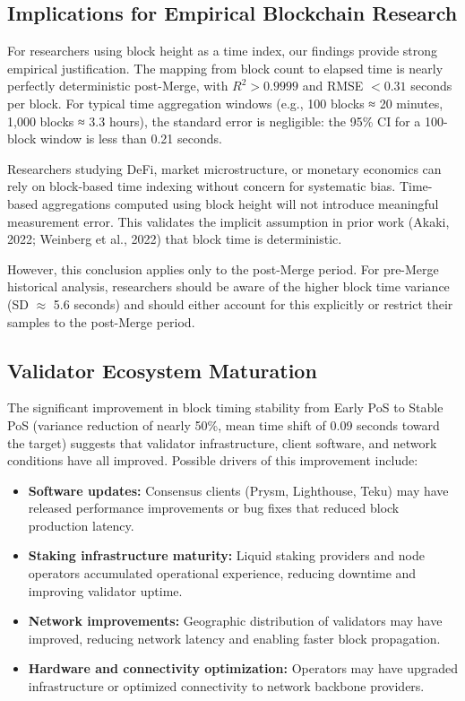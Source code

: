 \documentclass[12pt]{article}
\begin{document}
\subsection{Implications for Empirical Blockchain Research}

For researchers using block height as a time index, our findings provide strong empirical justification. The mapping from block count to elapsed time is nearly perfectly deterministic post-Merge, with $R^2 > 0.9999$ and RMSE $< 0.31$ seconds per block. For typical time aggregation windows (e.g., 100 blocks ≈ 20 minutes, 1,000 blocks ≈ 3.3 hours), the standard error is negligible: the 95\% CI for a 100-block window is less than 0.21 seconds.

Researchers studying DeFi, market microstructure, or monetary economics can rely on block-based time indexing without concern for systematic bias. Time-based aggregations computed using block height will not introduce meaningful measurement error. This validates the implicit assumption in prior work (Akaki, 2022; Weinberg et al., 2022) that block time is deterministic.

However, this conclusion applies only to the post-Merge period. For pre-Merge historical analysis, researchers should be aware of the higher block time variance (SD $\approx$ 5.6 seconds) and should either account for this explicitly or restrict their samples to the post-Merge period.

\subsection{Validator Ecosystem Maturation}

The significant improvement in block timing stability from Early PoS to Stable PoS (variance reduction of nearly 50\%, mean time shift of 0.09 seconds toward the target) suggests that validator infrastructure, client software, and network conditions have all improved. Possible drivers of this improvement include:
\begin{itemize}
\item \textbf{Software updates:} Consensus clients (Prysm, Lighthouse, Teku) may have released performance improvements or bug fixes that reduced block production latency.
\item \textbf{Staking infrastructure maturity:} Liquid staking providers and node operators accumulated operational experience, reducing downtime and improving validator uptime.
\item \textbf{Network improvements:} Geographic distribution of validators may have improved, reducing network latency and enabling faster block propagation.
\item \textbf{Hardware and connectivity optimization:} Operators may have upgraded infrastructure or optimized connectivity to network backbone providers.
\end{itemize}
\end{document}
